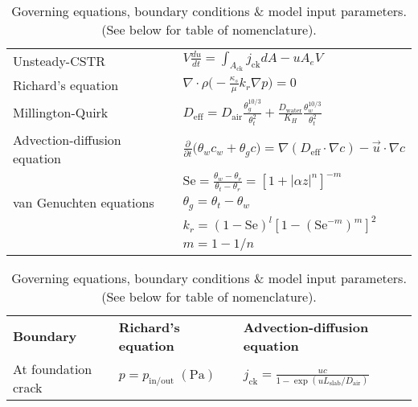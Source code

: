 \documentclass[journal=esthag,manuscript=article]{achemso}
\begin{document}
\begin{table}[htb!]
  \centering
  \caption{Governing equations, boundary conditions \& model input parameters. (See below for table of nomenclature).}
  \label{tbl:eqns-bc-parameters}
  \bigskip
  \begin{tabular}{l l}
    \toprule
    Unsteady-CSTR                 & $V\frac{d u}{d t} = \int_{A_\mathrm{ck}} j_\mathrm{ck} dA - u A_e V$ \\
    Richard's equation            & $\nabla \cdot \rho \Big( - \frac{\kappa_s}{\mu} k_r \nabla p \Big) = 0$ \\
    Millington-Quirk              & $D_\mathrm{eff} = D_\mathrm{air}\frac{\theta_g^{10/3}}{\theta_t^2} + \frac{D_\mathrm{water}}{K_H} \frac{\theta_w^{10/3}}{\theta_t^2}$ \\
    Advection-diffusion equation  & $\frac{\partial}{\partial t} \Big( \theta_w c_w + \theta_g c \Big) = \nabla (D_\mathrm{eff} \cdot \nabla c) - \vec{u} \cdot \nabla c$ \\
    \multirow{3}{*}{van Genuchten equations}     & $\mathrm{Se} = \frac{\theta_w - \theta_r}{\theta_t - \theta_r} = [1 + |\alpha z|^n]^{-m}$ \\
                                  & $\theta_g = \theta_t - \theta_w$ \\
                                  & $k_r = (1 - \mathrm{Se})^{l} [1 - (\mathrm{Se}^{-m})^m]^2$ \\
                                  & $m = 1 - 1/n$ \\
    \bottomrule
  \end{tabular}
  \bigskip
  \begin{tabular}{l l l}
    \toprule
    \textbf{Boundary}          & \textbf{Richard's equation}      &   \textbf{Advection-diffusion equation} \\
    At foundation crack  & $p = p_\mathrm{in/out} \; \mathrm{(Pa)}$                            & $j_\mathrm{ck} = \frac{u c}{1 - \exp{(u L_\mathrm{slab}/D_\mathrm{air})}}$ \\

\end{tabular}
\end{table}
\end{document}
